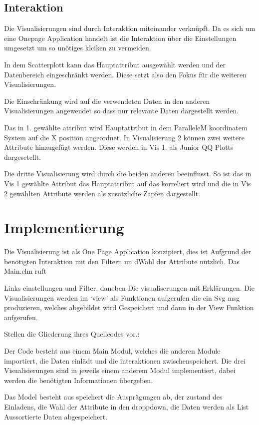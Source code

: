 \documentclass[usegeometry=true]{scrartcl}
\begin{document}
\subsection{Interaktion}
Die Visualisierungen sind durch Interaktion miteinander verknüpft. Da es sich um eine Onepage Application handelt ist die 
Interaktion über die Einstellungen umgesetzt um so unötiges klciken zu vermeiden.

In dem Scatterplott kann das Hauptattribut ausgewählt werden und der Datenbereich eingeschränkt werden. 
Diese setzt also den Fokus für die weiteren Visualisierungen.

Die Einschränkung wird auf die verwendeten Daten in den anderen Visualisierungen angewendet so dass nur relevante Daten dargestellt werden.

Das in 1. gewählte attribut wird  Hauptattribut in dem ParalleleM koordinatem System auf die X position angeordnet.
In Visualisierung 2 können zwei weitere  Attribute hinzugefügt werden. Diese werden in Vis 1. als Junior QQ Plotts dargesetellt.

Die dritte Visualisierung wird durch die beiden anderen beeinflusst. So ist das in Vis 1 gewählte Attribut das Hauptattribut auf das korreliert wird und die in Vis 2 gewählten Attribute werden als zusätzliche Zapfen dargestellt.


\section{Implementierung}
Die Visualisierung ist als One Page Application konzipiert, dies ist Aufgrund der benötigten Interaktion mit den Filtern un dWahl der Attribute nützlich.
Das Main.elm ruft

Links einstellungen und Filter, daneben Die visualiserungen mit Erklärungen.
Die Visualisierungen werden im `view' als Funktionen aufgerufen die ein Svg msg produzieren, welches abgebildet wird 
 Gespeichert und dann in der View Funktion aufgerufen.


Stellen die Gliederung ihres Quellcodes vor.:

Der Code besteht aus einem Main Modul, welches die anderen Module importiert, die Daten einlädt und die interaktionen zwischenspeichert.
Die drei Visualisierungen sind in jeweils einem anderem Modul implementiert, dabei werden die benötigten Informationen übergeben.

Das Model besteht aus speichert die Ausprägungen ab, der zustand des Einladens, 
die Wahl der Attribute in den droppdown, die Daten werden als List Aussortierte Daten abgespeichert.
\end{document}
